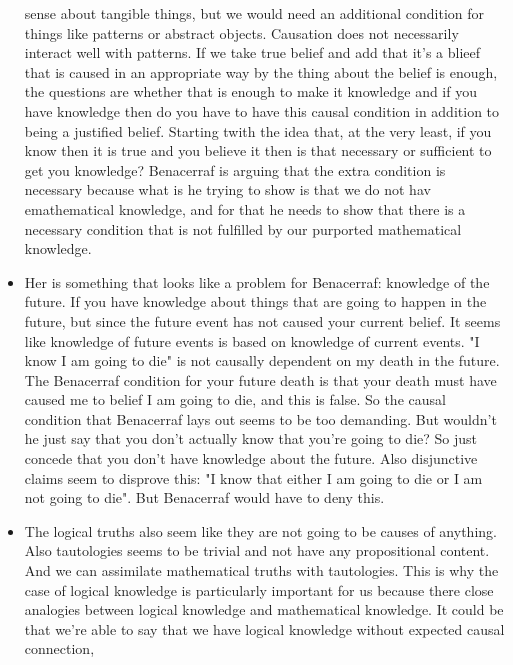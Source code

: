\documentclass[12pt]{article}
\theoremstyle{definition}
\begin{document}
\begin{itemize}
        sense about tangible things, but we would need an additional condition
        for things like patterns or abstract objects. Causation does not
        necessarily interact well with patterns. If we take true belief and add
        that it's a blieef that is caused in an appropriate way by the thing
        about the belief is enough, the questions are whether that is enough to
        make it knowledge and if you have knowledge then do you have to have
        this causal condition in addition to being a justified belief. Starting
        twith the idea that, at the very least, if you know then it is true and
        you believe it then is that necessary or sufficient to get you
        knowledge? Benacerraf is arguing that the extra condition is necessary
        because what is he trying to show is that we do not hav emathematical
        knowledge, and for that he needs to show that there is a necessary
        condition that is not fulfilled by our purported mathematical
        knowledge.
    \item
        Her is something that looks like a problem for Benacerraf: knowledge of
        the future. If you have knowledge about things that are going to happen
        in the future, but since the future event has not caused your current
        belief. It seems like knowledge of future events is based on knowledge
        of current events. "I know I am going to die" is not causally dependent
        on my death in the future. The Benacerraf condition for your future
        death is that your death must have caused me to belief I am going to
        die, and this is false. So the causal condition that Benacerraf lays
        out seems to be too demanding. But wouldn't he just say that you don't
        actually know that you're going to die? So just concede that you don't
        have knowledge about the future. Also disjunctive claims seem to
        disprove this: "I know that either I am going to die or I am not going
        to die". But Benacerraf would have to deny this. 
    \item
        The logical truths also seem like they are not going to be causes of
        anything. Also tautologies seems to be trivial and not have any
        propositional content.  And we can assimilate mathematical truths with
        tautologies. This is why the case of logical knowledge is particularly
        important for us because there close analogies between logical
        knowledge and mathematical knowledge. It could be that we're able to
        say that we have logical knowledge without expected causal connection,

\end{itemize}
\end{document}
